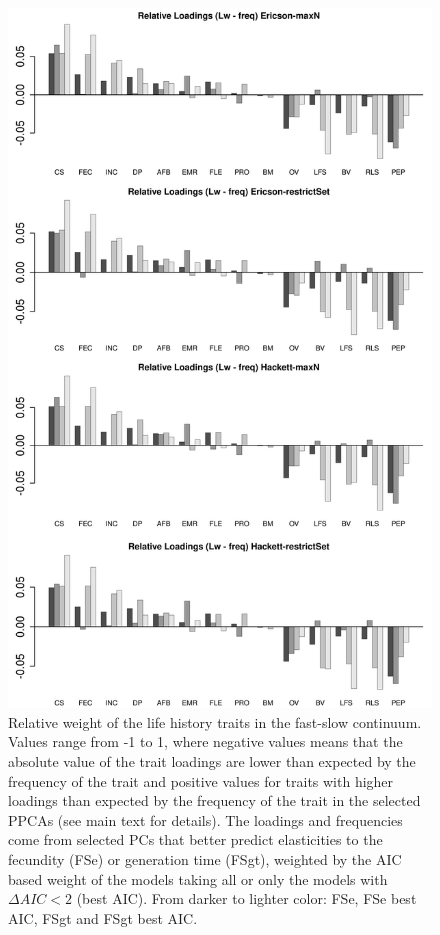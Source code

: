 \begin{figure}[ht!]
\centering
\includegraphics[width=.8\textwidth]{./Figures/Appendix2_1/FS relWeights plots-ALL.png}
\caption[LHT relative importance of the FS axes]{
Relative weight of the life history traits in the fast-slow continuum. Values
range from -1 to 1, where negative values means that the absolute value of the
trait loadings are lower than expected by the frequency of the trait and
positive values for traits with higher loadings than expected by the frequency
of the trait in the selected PPCAs (see main text for details). The loadings and
frequencies come from selected PCs that better predict elasticities to the
fecundity (FSe) or generation time (FSgt), weighted by the AIC based weight
of the models taking all or only the models with $\Delta AIC < 2$ (best AIC).
From darker to lighter color: FSe, FSe best AIC, FSgt and FSgt best AIC.}
\label{fig:figApp2.2}
\end{figure}

